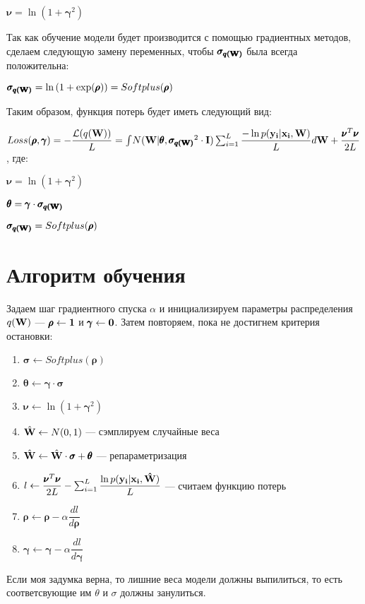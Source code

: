 \documentclass{article}
\begin{document}
$\pmb{\nu} = \ln{(1 + \pmb{\gamma}^2)}$

Так как обучение модели будет производится с помощью градиентных методов, сделаем следующую замену переменных, чтобы
$\pmb{\sigma_{q(\bold{W})}}$ была всегда положительна:

$\pmb{\sigma_{q(\bold{W})}} = \ln{(1+\exp(\pmb{\rho}))} = Softplus(\pmb{\rho})$

Таким образом, функция потерь будет иметь следующий вид:

$
Loss(\pmb{\rho}, \pmb{\gamma}) =
- \dfrac{\mathcal{L}(q(\bold{W}))}{L} =
\int_{}{} N(\bold{W} | \pmb{\theta}, \pmb{\sigma_{q(\bold{W})}}^{2} \cdot \bold{I}) \sum_{i=1}^{L}{\dfrac{-\ln{p( \bold{y_{i}} | \bold{x_{i}}, \bold{W})}}{L}} d\bold{W} + \dfrac{\pmb{\nu}^{T} \pmb{\nu}}{2L}
$, где:

$\pmb{\nu} = \ln{(1 + \pmb{\gamma}^2)}$

$\pmb{\theta} = \pmb{\gamma} \cdot \pmb{\sigma_{q(\bold{W})}}$

$\pmb{\sigma_{q(\bold{W})}} = Softplus(\pmb{\rho})$

\section{Алгоритм обучения}
Задаем шаг градиентного спуска $\alpha$ и инициализируем параметры распределения $q(\bold{W})$ — $\pmb{\rho} \leftarrow \bold{1}$ и $\pmb{\gamma} \leftarrow \bold{0}$. Затем повторяем, пока не достигнем критерия остановки:
\begin{enumerate}
    \item $\pmb{\sigma} \leftarrow Softplus(\pmb{\rho})$
    \item $\pmb{\theta} \leftarrow \pmb{\gamma} \cdot \pmb{\sigma}$
    \item $\pmb{\nu} \leftarrow \ln{(1 + \pmb{\gamma}^2)}$
    \item $\hat{\bold{W}} \leftarrow N(0, 1)$ — сэмплируем случайные веса
    \item $\hat{\bold{W}} \leftarrow \hat{\bold{W}} \cdot \pmb{\sigma} + \pmb{\theta}$ — репараметризация
    \item $l \leftarrow \dfrac{\pmb{\nu}^{T} \pmb{\nu}}{2L} -\sum_{i=1}^{L}{\dfrac{\ln{p( \bold{y_{i}} | \bold{x_{i}}, \bold{\hat{W}})}}{L}}$ — считаем функцию потерь
    \item $\pmb{\rho} \leftarrow \pmb{\rho} - \alpha \dfrac{d l}{d \pmb{\rho}}$
    \item $\pmb{\gamma} \leftarrow \pmb{\gamma} - \alpha \dfrac{d l}{d \pmb{\gamma}}$
\end{enumerate}

Если моя задумка верна, то лишние веса модели должны выпилиться, то есть соответсвующие им $\theta$ и $\sigma$ должны занулиться.
\end{document}
